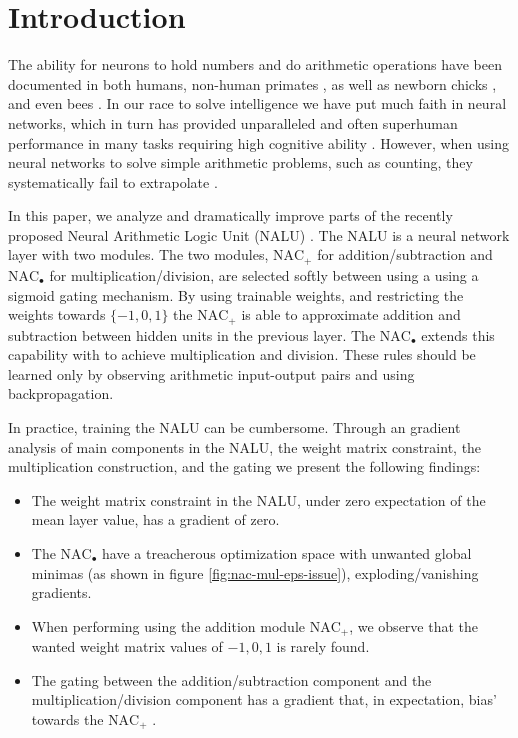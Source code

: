 \section{Introduction}

The ability for neurons to hold numbers and do arithmetic operations have been documented in both humans, non-human primates \cite{nieder-neuronal-number}, as well as newborn chicks \cite{rugani-arithmetic-chicks}, and even bees \cite{gallistel-numbers-in-brain}.
In our race to solve intelligence we have put much faith in neural networks, which in turn has provided unparalleled and often superhuman performance in many tasks requiring high cognitive ability \cite{natureGo,googleNMT,resnet}.
However, when using neural networks to solve simple arithmetic problems, such as counting, they systematically fail to extrapolate \cite{stillNotSystematic,suzgun2019evaluating,trask-nalu}.

In this paper, we analyze and dramatically improve parts of the recently proposed Neural Arithmetic Logic Unit (NALU) \cite{trask-nalu}.
The NALU is a neural network layer with two modules.
The two modules, $\text{NAC}_{+}$ for addition/subtraction and $\text{NAC}_{\bullet}$ for multiplication/division, are selected softly between using a using a sigmoid gating mechanism.
By using trainable weights, and restricting the weights towards $\{-1,0,1\}$ the $\text{NAC}_{+}$ is able to approximate addition and subtraction between hidden units in the previous layer.
The $\text{NAC}_{\bullet}$ extends this capability with to achieve multiplication and division. 
These rules should be learned only by observing arithmetic input-output pairs and using backpropagation\cite{rumelhart1986learning}.

In practice, training the NALU can be cumbersome.
Through an gradient analysis of main components in the NALU, the weight matrix constraint, the multiplication construction, and the gating we present the following findings:

\begin{itemize}
\item The weight matrix constraint in the NALU, under zero expectation of the mean layer value\cite{glorot-initialization}, has a gradient of zero.

\item The $\text{NAC}_{\bullet}$ have a treacherous optimization space with unwanted global minimas (as shown in figure \ref{fig:nac-mul-eps-issue}), exploding/vanishing gradients.

\item When performing using the addition module $\text{NAC}_{+}$, we observe that the wanted weight matrix values of ${-1, 0, 1}$ is rarely found.

\item The gating between the addition/subtraction component and the multiplication/division component has a gradient that, in expectation, bias' towards the $\text{NAC}_{\text{+}}$ .
\end{itemize}

